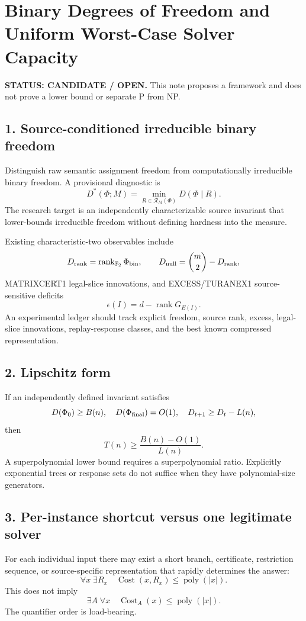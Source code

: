 \section*{Binary Degrees of Freedom and Uniform Worst-Case Solver Capacity}

\textbf{STATUS: CANDIDATE / OPEN.} This note proposes a framework and does not prove a lower bound or separate P from NP.

\subsection*{1. Source-conditioned irreducible binary freedom}
Distinguish raw semantic assignment freedom from computationally irreducible binary freedom. A provisional diagnostic is
\[
D^*(\Phi;M)=\min_{R\in\mathcal R_M(\Phi)}D(\Phi\mid R).
\]
The research target is an independently characterizable source invariant that lower-bounds irreducible freedom without defining hardness into the measure.

Existing characteristic-two observables include
\[
D_{\rm rank}=\operatorname{rank}_{\mathbb F_2}\Phi_{\rm bin},
\qquad
D_{\rm null}=\binom m2-D_{\rm rank},
\]
MATRIXCERT1 legal-slice innovations, and EXCESS/TURANEX1 source-sensitive deficits
\[
\epsilon(I)=d-\operatorname{rank}G_{E(I)}.
\]
An experimental ledger should track explicit freedom, source rank, excess, legal-slice innovations, replay-response classes, and the best known compressed representation.

\subsection*{2. Lipschitz form}
If an independently defined invariant satisfies
\[
D(\Phi_0)\ge B(n),\quad D(\Phi_{\rm final})=O(1),\quad
D_{t+1}\ge D_t-L(n),
\]
then
\[
T(n)\ge \frac{B(n)-O(1)}{L(n)}.
\]
A superpolynomial lower bound requires a superpolynomial ratio. Explicitly exponential trees or response sets do not suffice when they have polynomial-size generators.

\subsection*{3. Per-instance shortcut versus one legitimate solver}
For each individual input there may exist a short branch, certificate, restriction sequence, or source-specific representation that rapidly determines the answer:
\[
\forall x\;\exists R_x\quad \operatorname{Cost}(x,R_x)\le\operatorname{poly}(|x|).
\]
This does not imply
\[
\exists A\;\forall x\quad \operatorname{Cost}_A(x)\le\operatorname{poly}(|x|).
\]
The quantifier order is load-bearing.

